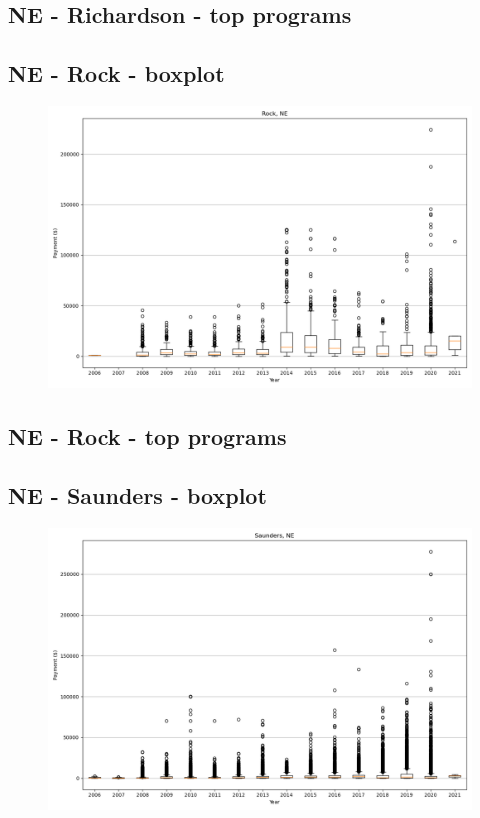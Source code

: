 \subsection*{NE - Richardson - top programs}

\newpage
\subsection*{NE - Rock - boxplot}
\begin{figure}[h]
\centering
\includegraphics[width=7in]{../output/boxplots/counties/Rock-NE_boxplot.png}
\end{figure}


\subsection*{NE - Rock - top programs}

\newpage
\subsection*{NE - Saunders - boxplot}
\begin{figure}[h]
\centering
\includegraphics[width=7in]{../output/boxplots/counties/Saunders-NE_boxplot.png}
\end{figure}


